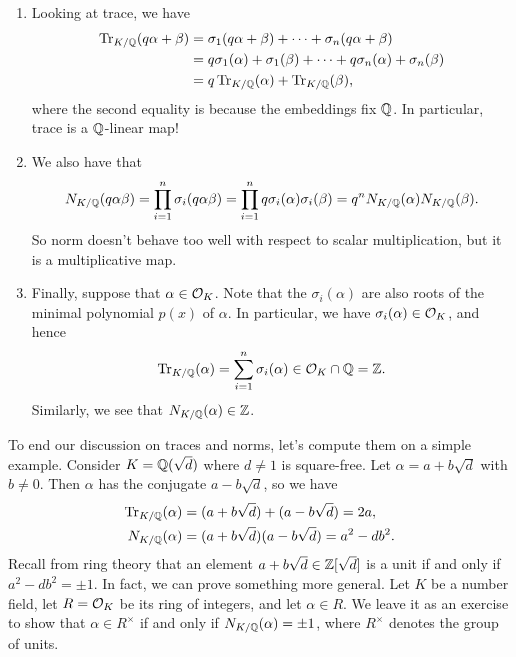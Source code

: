 \begin{enumerate}[(1)]
    \item Looking at trace, we have 
    \begin{align*}
        \operatorname{Tr}_{K/\mathbb{Q}}(q\alpha + \beta) 
        &= \sigma_1(q\alpha + \beta) + \cdots + \sigma_n(q\alpha + \beta) \\ 
        &= q\sigma_1(\alpha) + \sigma_1(\beta) + \cdots + q\sigma_n(\alpha) + \sigma_n(\beta) \\ 
        &= q\operatorname{Tr}_{K/\mathbb{Q}}(\alpha) + \operatorname{Tr}_{K/\mathbb{Q}}(\beta),
    \end{align*}
    where the second equality is because the embeddings fix $\mathbb{Q}$.
    In particular, trace is a $\mathbb{Q}$-linear map! 
    
    \item We also have that 
    \[ N_{K/\mathbb{Q}}(q\alpha\beta) = \prod_{i=1}^n \sigma_i(q\alpha\beta) 
    = \prod_{i=1}^n q\sigma_i(\alpha) \sigma_i(\beta) = q^n N_{K/\mathbb{Q}}(\alpha) 
    N_{K/\mathbb{Q}}(\beta). \] 
    So norm doesn't behave too well with respect to scalar multiplication, but 
    it is a multiplicative map.
    
    \item Finally, suppose that $\alpha \in {\cal O}_K$. Note that the 
    $\sigma_i(\alpha)$ are also roots of the minimal polynomial 
    $p(x)$ of $\alpha$. In particular, we have $\sigma_i(\alpha) \in {\cal O}_K$, 
    and hence 
    \[ \operatorname{Tr}_{K/\mathbb{Q}}(\alpha) = \sum_{i=1}^n \sigma_i(\alpha) \in {\cal O}_K \cap \mathbb{Q} = \mathbb{Z}. \] 
    Similarly, we see that $N_{K/\mathbb{Q}}(\alpha) \in \mathbb{Z}$. 
\end{enumerate} 
To end our discussion on traces and norms, let's compute them 
on a simple example. Consider $K = \mathbb{Q}(\sqrt{d})$ where $d \neq 1$ is square-free.
Let $\alpha = a + b\sqrt{d}$ with $b \neq 0$. Then $\alpha$ has the 
conjugate $a - b\sqrt{d}$, so we have 
\begin{align*}
    \operatorname{Tr}_{K/\mathbb{Q}}(\alpha) &= (a + b\sqrt{d}) + (a - b\sqrt{d}) = 2a, \\
    N_{K/\mathbb{Q}}(\alpha) &= (a + b\sqrt{d})(a - b\sqrt{d}) = a^2 - db^2.
\end{align*}
Recall from ring theory that an element $a + b\sqrt{d} \in \mathbb{Z}[\sqrt{d}]$ is a 
unit if and only if $a^2 - db^2 = \pm1$. In fact, we can prove something more 
general. Let $K$ be a number field, let $R = {\cal O}_K$ be its ring of integers, 
and let $\alpha \in R$. We leave it as an exercise to show that $\alpha \in R^\times$ 
if and only if $N_{K/\mathbb{Q}}(\alpha) = \pm1$, where $R^\times$ denotes the group of units. 

